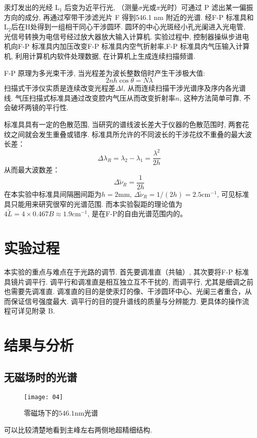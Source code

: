 \documentclass[aps,pre,12pt,preprint,onecolumn,showpacs,showkeys]{revtex4-1}
\begin{document}
汞灯发出的光经 $\mathrm{L}_1$ 后变为近平行光, （测量$\sigma$光或$\pi$光时）可通过 P 滤出某一偏振方向的成分, 再通过窄带干涉滤光片 F 得到546.1 nm 附近的光谱. 经F-P 标准具和$\mathrm L_2$后在H处得到一组相干同心干涉圆环. 圆环的中心光斑经小孔光阑进入光电管, 光信号转换为电信号经过放大器放大输入计算机. 实验过程中, 控制器操纵步进电机向F-P 标准具内加压改变F-P 标准具内空气折射率,F-P 标准具内气压输入计算机, 利用计算机内软件处理数据, 在计算机上生成连续扫描频谱.

F-P 原理为多光束干涉, 当光程差为波长整数倍时产生干涉极大值: 
\begin{equation}
2 n h \cos \theta=N \lambda
\end{equation}
扫描式干涉仪实质是连续改变光程差$\Delta l$, 从而连续扫描干涉光谱序及序内各光谱线. 气压扫描式标准具通过改变腔内气压从而改变折射率$n$, 这种方法简单可靠, 不会破坏两镜的平行性.

标准具具有一定的色散范围, 当研究的谱线波长差大于仪器的色散范围时, 两套花纹之间就会发生重叠或错序. 标准具所允许的不同波长的干涉花纹不重叠的最大波长差：
\begin{equation}
\Delta \lambda_R=\lambda_2-\lambda_1=\frac{\lambda^2}{2h}
\end{equation}
从而最大波数差：
\begin{equation}
\Delta \tilde{\nu}_R=\frac{1}{2h}
\end{equation}
在本实验中标准具间隔圈间距为$h=2\mathrm{mm}$, $\Delta \tilde{\nu}_R=1/(2h)=2.5  \mathrm{cm}^{-1}$, 可见标准具只能用来研究很窄的光谱范围.  而本实验裂距的理论值为$4\tilde{L}=4\times0.467B\approx1.9\mathrm{cm}^{-1}$, 是在F-P的自由光谱范围内的。



\section{实验过程}
本实验的重点与难点在于光路的调节. 首先要调准直（共轴）, 其次要将F-P 标准具镜片调平行. 调平行和调准直是相互独立互不干扰的, 而调平行, 尤其是细调之前也需要先调准直. 调准直的目的是使汞灯的像、干涉圆环中心、光阑三者重合，从而保证信号强度最大. 调平行的目的提升谱线的质量与分辨能力. 更具体的操作流程可详见附录 B. 

\section{结果与分析}
\subsection{无磁场时的光谱}
\begin{figure}[h]
\centering
\texttt{[image: 04]}
\caption{\label{fig:无磁场}%
零磁场下的$546.1 \mathrm{nm}$光谱}
\end{figure}
可以比较清楚地看到主峰左右两侧地超精细结构. 
\end{document}
